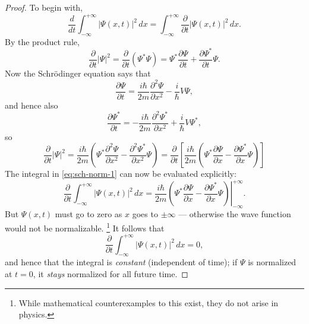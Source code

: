\documentclass{article}
\begin{document}
\begin{proof}
  To begin with,
  \begin{equation} \label{eq:sch-norm-1}
    \frac{d}{dt} \int_{-\infty}^{+\infty} |\Psi(x, t)|^2 \,dx
    = \int_{-\infty}^{+\infty} \frac{\partial}{\partial t} |\Psi(x, t)|^2 \,dx.
  \end{equation}
  By the product rule,
  \begin{equation} \label{eq:sch-norm-2}
    \frac{\partial}{\partial t}|\Psi|^2 = \frac{\partial}{\partial t}
    (\Psi^* \Psi)
    = \Psi^* \frac{\partial \Psi}{\partial t} +
    \frac{\partial \Psi^*}{\partial t} \Psi.
  \end{equation}
  Now the Schr\"{o}dinger equation says that
  \begin{equation} \label{eq:sch-norm-3}
    \frac{\partial \Psi}{\partial t}
    = \frac{i\hbar}{2m} \frac{\partial^2 \Psi}{\partial x^2} -
    \frac{i}{\hbar} V \Psi,
  \end{equation}
  and hence also
  \begin{equation} \label{eq:sch-norm-4}
    \frac{\partial \Psi^*}{\partial t} = -\frac{i\hbar}{2m}
    \frac{\partial^2 \Psi^*}{\partial x^2} + \frac{i}{\hbar} V \Psi^*,
  \end{equation}
  so
  \begin{equation} \label{eq:sch-norm-5}
    \frac{\partial}{\partial t} |\Psi|^2
    = \frac{i\hbar}{2m} \left(
      \Psi^* \frac{\partial^2 \Psi}{\partial x^2} -
      \frac{\partial^2 \Psi^*}{\partial x^2} \Psi
    \right)
    = \frac{\partial}{\partial t} \left[
      \frac{i\hbar}{2m} \left(
        \Psi^* \frac{\partial \Psi}{\partial x} -
        \frac{\partial \Psi^*}{\partial x} \Psi
      \right)
    \right]
  \end{equation}
  The integral in \eqref{eq:sch-norm-1} can now be evaluated explicitly:
  \begin{equation} \label{eq:sch-norm-6}
    \frac{\partial}{\partial t} \int_{-\infty}^{+\infty} |\Psi(x, t)|^2 \,dx
    = \frac{i\hbar}{2m} \left. \left(
      \Psi^* \frac{\partial \Psi}{\partial x} -
      \frac{\partial \Psi^*}{\partial x} \Psi
    \right) \right|_{-\infty}^{+\infty}.
  \end{equation}
  But $\Psi(x, t)$ must go to zero as $x$ goes to $\pm\infty$ --- otherwise the
  wave function would not be normalizable. \footnote{While mathematical
  counterexamples to this exist, they do not arise in physics.} It follows that
  \begin{equation} \label{eq:sch-norm-7}
    \frac{\partial}{\partial t} \int_{-\infty}^{+\infty} |\Psi(x, t)|^2 \,dx
    = 0,
  \end{equation}
  and hence that the integral is \emph{constant} (independent of time); if
  $\Psi$ is normalized at $t = 0$, it \emph{stays} normalized for all future
  time.
\end{proof}
\end{document}
